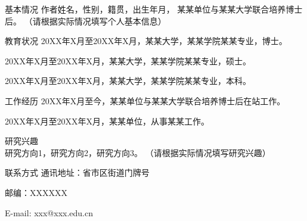 \begin{resume}

\begin{resumesection}{基本情况}
作者姓名，性别，籍贯，出生年月，
某某单位与某某大学联合培养博士后。
（请根据实际情况填写个人基本信息）

\end{resumesection}

\begin{resumelist}{教育状况}
20XX年X月至20XX年X月，某某大学，某某学院某某专业，博士。

20XX年X月至20XX年X月，某某大学，某某学院某某专业，硕士。

20XX年X月至20XX年X月，某某大学，某某学院某某专业，本科。
\end{resumelist}

\begin{resumelist}{工作经历}
20XX年X月至今，某某单位与某某大学联合培养博士后在站工作。

20XX年X月至20XX年X月，某某单位，从事某某工作。
\end{resumelist}

\begin{resumelist}{研究兴趣}
研究方向1，研究方向2，研究方向3。
（请根据实际情况填写研究兴趣）
\end{resumelist}

\begin{resumelist}{联系方式}
通讯地址：省市区街道门牌号

邮编：XXXXXX

E-mail: xxx@xxx.edu.cn
\end{resumelist}

\end{resume}